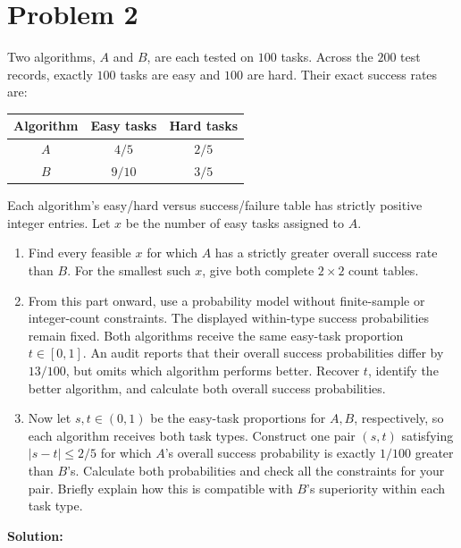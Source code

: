 \documentclass[11pt,a4paper]{article}
\begin{document}
\section*{Problem 2}
Two algorithms, $A$ and $B$, are each tested on $100$ tasks. Across the $200$ test records, exactly $100$ tasks are easy and $100$ are hard. Their exact success rates are:
\begin{center}
\begin{tabular}{ccc}
\toprule Algorithm & Easy tasks & Hard tasks\\\midrule
$A$ & $4/5$ & $2/5$\\
$B$ & $9/10$ & $3/5$\\\bottomrule
\end{tabular}
\end{center}
Each algorithm's easy/hard versus success/failure table has strictly positive integer entries. Let $x$ be the number of easy tasks assigned to $A$.
\begin{enumerate}
\item Find every feasible $x$ for which $A$ has a strictly greater overall success rate than $B$. For the smallest such $x$, give both complete $2\times2$ count tables.
\item From this part onward, use a probability model without finite-sample or integer-count constraints. The displayed within-type success probabilities remain fixed. Both algorithms receive the same easy-task proportion $t\in[0,1]$. An audit reports that their overall success probabilities differ by $13/100$, but omits which algorithm performs better. Recover $t$, identify the better algorithm, and calculate both overall success probabilities.
\item Now let $s,t\in(0,1)$ be the easy-task proportions for $A,B$, respectively, so each algorithm receives both task types. Construct one pair $(s,t)$ satisfying $|s-t|\leq2/5$ for which $A$'s overall success probability is exactly $1/100$ greater than $B$'s. Calculate both probabilities and check all the constraints for your pair. Briefly explain how this is compatible with $B$'s superiority within each task type.
\end{enumerate}

\textbf{Solution:}
\end{document}
